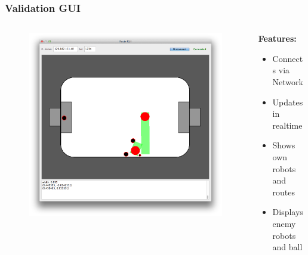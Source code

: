 \documentclass[hyperref={pdfpagelabels=false}]{beamer}
\begin{document}
\begin{frame}
    \frametitle{Validation GUI}
    \begin{columns}[T]
        \begin{column}{0.4\textwidth}
            \begin{figure}
                \center
                \includegraphics[width=\textwidth]{Pictures/gui-1}
            \end{figure}
        \end{column}
        \begin{column}{0.6\textwidth}
            \textbf{Features:}
            \begin{itemize}
                \item Connects via Network
                \item Updates in realtime
                \item Shows own robots and routes
                \item Displays enemy robots and ball
            \end{itemize}
        \end{column}
    \end{columns}
\end{frame}
\end{document}
